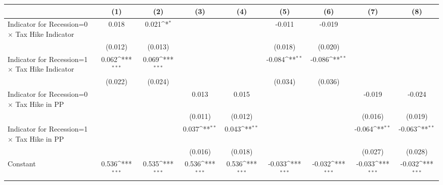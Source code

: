 {
\def\sym#1{\ifmmode^{#1}\else\(^{#1}\)\fi}
\begin{tabular}{l*{8}{c}}
\toprule
                    &\multicolumn{1}{c}{(1)}         &\multicolumn{1}{c}{(2)}         &\multicolumn{1}{c}{(3)}         &\multicolumn{1}{c}{(4)}         &\multicolumn{1}{c}{(5)}         &\multicolumn{1}{c}{(6)}         &\multicolumn{1}{c}{(7)}         &\multicolumn{1}{c}{(8)}         \\
\midrule
Indicator for Recession=0 $\times$ Tax Hike Indicator&       0.018         &       0.021\sym{*}  &                     &                     &      -0.011         &      -0.019         &                     &                     \\
                    &     (0.012)         &     (0.013)         &                     &                     &     (0.018)         &     (0.020)         &                     &                     \\
Indicator for Recession=1 $\times$ Tax Hike Indicator&       0.062\sym{***}&       0.069\sym{***}&                     &                     &      -0.084\sym{**} &      -0.086\sym{**} &                     &                     \\
                    &     (0.022)         &     (0.024)         &                     &                     &     (0.034)         &     (0.036)         &                     &                     \\
Indicator for Recession=0 $\times$ Tax Hike in PP&                     &                     &       0.013         &       0.015         &                     &                     &      -0.019         &      -0.024         \\
                    &                     &                     &     (0.011)         &     (0.012)         &                     &                     &     (0.016)         &     (0.019)         \\
Indicator for Recession=1 $\times$ Tax Hike in PP&                     &                     &       0.037\sym{**} &       0.043\sym{**} &                     &                     &      -0.064\sym{**} &      -0.063\sym{**} \\
                    &                     &                     &     (0.016)         &     (0.018)         &                     &                     &     (0.027)         &     (0.028)         \\
Constant            &       0.536\sym{***}&       0.535\sym{***}&       0.536\sym{***}&       0.536\sym{***}&      -0.033\sym{***}&      -0.032\sym{***}&      -0.033\sym{***}&      -0.032\sym{***}\\

\end{tabular}}
